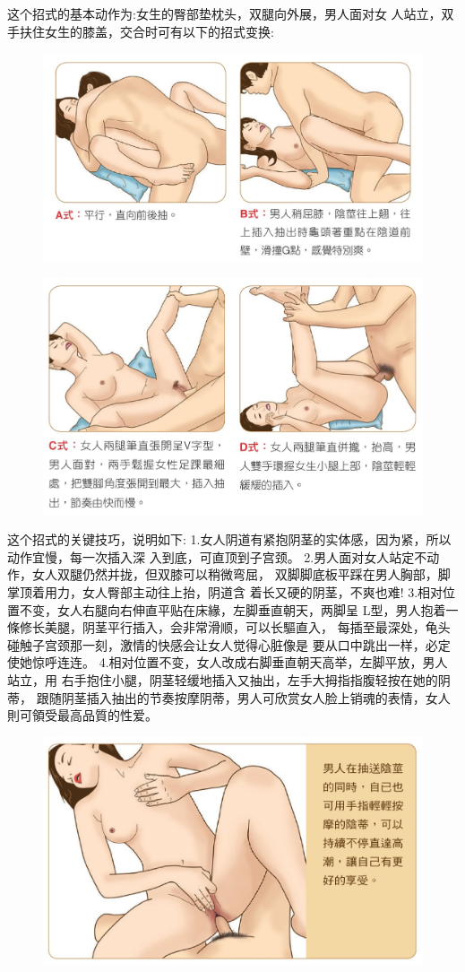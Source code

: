 \documentclass[12pt,UTF8]{ctexbook}
\begin{document}
这个招式的基本动作为:女生的臀部垫枕头，双腿向外展，男人面对女
人站立，双手扶住女生的膝盖，交合时可有以下的招式变换:

\begin{figure}[htbp]
	\centering
	\includegraphics[width=0.7\linewidth]{29}
	\caption{}
	\label{fig:1}
\end{figure}

\begin{figure}[htbp]
	\centering
	\includegraphics[width=0.7\linewidth]{30}
	\caption{}
	\label{fig:1}
\end{figure}

这个招式的关键技巧，说明如下:
1.女人阴道有紧抱阴茎的实体感，因为紧，所以动作宜慢，每一次插入深
入到底，可直顶到子宫颈。
2.男人面对女人站定不动作，女人双腿仍然并拢，但双膝可以稍微弯屈，
双脚脚底板平踩在男人胸部，脚掌顶着用力，女人臀部主动往上抬，阴道含
着长又硬的阴茎，不爽也难!
3.相对位置不变，女人右腿向右伸直平贴在床緣，左脚垂直朝天，两脚呈
L型，男人抱着一條修长美腿，阴茎平行插入，会非常滑顺，可以长驅直入，
每插至最深处，龟头碰触子宫颈那一刻，激情的快感会让女人觉得心脏像是
要从口中跳出一样，必定使她惊呼连连。
4.相对位置不变，女人改成右脚垂直朝天高举，左脚平放，男人站立，用
右手抱住小腿，阴茎轻缓地插入又抽出，左手大拇指指腹轻按在她的阴蒂，
跟随阴茎插入抽出的节奏按摩阴蒂，男人可欣赏女人脸上销魂的表情，女人
則可領受最高品質的性爱。

\begin{figure}[htbp]
	\centering
	\includegraphics[width=0.7\linewidth]{31}
	\caption{}
	\label{fig:1}
\end{figure}
\end{document}
